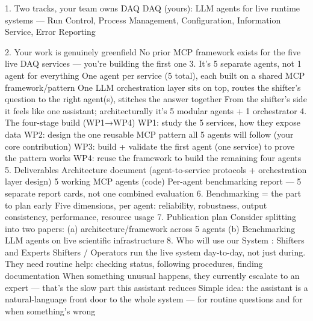 1. Two tracks, your team owns DAQ
DAQ (yours): LLM agents for live runtime systems — Run Control, Process Management, Configuration, Information Service, Error Reporting

2. Your work is genuinely greenfield
No prior MCP framework exists for the five live DAQ services — you're building the first one
3. It's 5 separate agents, not 1 agent for everything
One agent per service (5 total), each built on a shared MCP framework/pattern
One LLM orchestration layer sits on top, routes the shifter's question to the right agent(s), stitches the answer together
From the shifter's side it feels like one assistant; architecturally it's 5 modular agents + 1 orchestrator
4. The four-stage build (WP1→WP4)
WP1: study the 5 services, how they expose data
WP2: design the one reusable MCP pattern all 5 agents will follow (your core contribution)
WP3: build + validate the first agent (one service) to prove the pattern works
WP4: reuse the framework to build the remaining four agents
5. Deliverables
Architecture document (agent-to-service protocols + orchestration layer design)
5 working MCP agents (code)
Per-agent benchmarking report — 5 separate report cards, not one combined evaluation
6. Benchmarking = the part to plan early
Five dimensions, per agent: reliability, robustness, output consistency, performance, resource usage
7. Publication plan
Consider splitting into two papers: (a) architecture/framework across 5 agents (b) Benchmarking LLM agents on live scientific infrastructure
8. Who will use our System : Shifters and Experts
Shifters / Operators run the live system day-to-day, not just during. They need routine help: checking status, following procedures, finding documentation
When something unusual happens, they currently escalate to an expert — that's the slow part this assistant reduces
Simple idea: the assistant is a natural-language front door to the whole system — for routine questions and for when something's wrong


